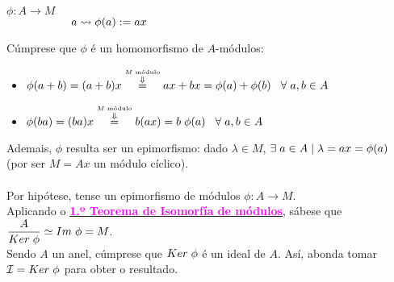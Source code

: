 \documentclass[twoside]{report}
\newcommand{\magbf}[1]{\textcolor{magenta}{\textbf{#1}}} %
\theoremstyle{mystyle}
\begin{document}
\begin{center}
    $\phi: A \longrightarrow M$\\
    \vspace{2mm}
    $\hspace{20mm} a \leadsto \phi(a) := ax$\\
\end{center}

\noindent Cúmprese que $\phi$ é un homomorfismo de $A$-módulos:\\

\begin{itemize}
    \item $\phi(a + b) = (a + b)x \overset{\overset{M \text{ módulo}}{\Downarrow}}{=} ax + bx = \phi(a) + \phi(b) \hspace{3mm} \forall \hspace{1mm} a,b \in A$
    \item $\phi(ba) = (ba)x \overset{\overset{M \text{ módulo}}{\Downarrow}}{=} b(ax) = b \hspace{1mm} \phi(a) \hspace{3mm} \forall \hspace{1mm} a,b \in A$
\end{itemize}

\noindent Ademais, $\phi$ resulta ser un epimorfismo: dado $\lambda \in M$, $\exists \hspace{1mm} a \in A \hspace{1mm} | \hspace{1mm} \lambda = ax = \phi(a)$ (por ser $M = Ax$ un módulo cíclico).\\

\noindent {}\\

\noindent Por hipótese, tense un epimorfismo de módulos $\phi: A \longrightarrow M$. \\

\noindent Aplicando o \hyperref[th3.1]{\magbf{1.º Teorema de Isomorfía de módulos}}, sábese que $\displaystyle \frac{A}{Ker \hspace{1mm} \phi} \simeq Im \hspace{1mm} \phi = M$.\\

\noindent Sendo $A$ un anel, cúmprese que $Ker \hspace{1mm} \phi$ é un ideal de $A$. Así, abonda tomar $\mathcal{I} = Ker \hspace{1mm} \phi$ para obter o resultado.\\
\end{document}

